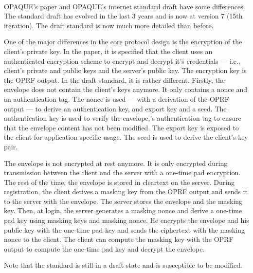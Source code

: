 ﻿\documentclass[../report.tex]{subfiles}
\begin{document}
\paragraph{} \label{sec:opaque_paper_vs_draft}
OPAQUE's paper \cite{OPAQUE_Paper} and OPAQUE's internet standard draft \cite{OPAQUE_Standard_Draft} have some differences. The standard draft has evolved in the last 3 years and is now at version 7 (15th iteration).
The draft standard is now much more detailed than before.

One of the major differences in the core protocol design is the encryption of the client's private key.
In the paper, it is specified that the client uses an authenticated encryption scheme to encrypt and decrypt it's credentials --- i.e., client's private and public keys and the server's public key. The encryption key is the OPRF output.
In the draft standard, it is rather different.
Firstly, the envelope does not contain the client's keys anymore. It only contains a nonce and an authentication tag. 
The nonce is used --- with a derivation of the OPRF output --- to derive an authentication key, and export key and a seed.
The authentication key is used to verify the envelope,'s authentication tag to ensure that the envelope content has not been modified.
The export key is exposed to the client for application specific usage.
The seed is used to derive the client's key pair.

The envelope is not encrypted at rest anymore. It is only encrypted during transmission between the client and the server with a one-time pad encryption. The rest of the time, the envelope is stored in cleartext on the server.
During registration, the client derives a masking key from the OPRF output and sends it to the server with the envelope. The server stores the envelope and the masking key.
Then, at login, the server generates a masking nonce and derive a one-time pad key using masking keys and masking nonce. He encrypts the envelope and his public key with the one-time pad key and sends the ciphertext with the masking nonce to the client.
The client can compute the masking key with the OPRF output to compute the one-time pad key and decrypt the envelope.


Note that the standard is still in a draft state and is susceptible to be modified.



\subsection{}
\end{document}
